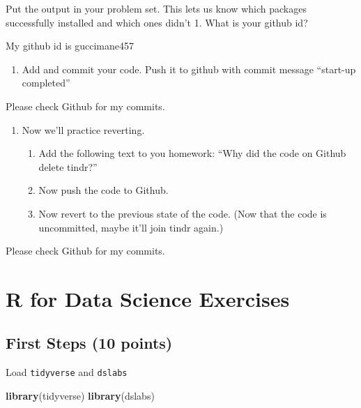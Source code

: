 \documentclass[
]{article}
\newenvironment{Shaded}{\begin{snugshade}}{\end{snugshade}}
\newcommand{\KeywordTok}[1]{\textcolor[rgb]{0.13,0.29,0.53}{\textbf{#1}}}
\newcommand{\NormalTok}[1]{#1}
\providecommand{\tightlist}{%
  \setlength{\itemsep}{0pt}\setlength{\parskip}{0pt}}
\begin{document}
Put the output in your problem set. This lets us know which packages
successfully installed and which ones didn't 1. What is your github id?

My github id is guccimane457

\begin{enumerate}
\def\labelenumi{\arabic{enumi}.}
\tightlist
\item
  Add and commit your code. Push it to github with commit message
  ``start-up completed''
\end{enumerate}

Please check Github for my commits.

\begin{enumerate}
\def\labelenumi{\arabic{enumi}.}
\tightlist
\item
  Now we'll practice reverting.

  \begin{enumerate}
  \def\labelenumii{\alph{enumii}.}
  \tightlist
  \item
    Add the following text to you homework: ``Why did the code on Github
    delete tindr?''
  \item
    Now push the code to Github.
  \item
    Now revert to the previous state of the code. (Now that the code is
    uncommitted, maybe it'll join tindr again.)
  \end{enumerate}
\end{enumerate}

Please check Github for my commits.

\hypertarget{r-for-data-science-exercises}{%
\section{R for Data Science
Exercises}\label{r-for-data-science-exercises}}

\hypertarget{first-steps-10-points}{%
\subsection{First Steps (10 points)}\label{first-steps-10-points}}

Load \texttt{tidyverse} and \texttt{dslabs}

\begin{Shaded}
\begin{Highlighting}[]
\KeywordTok{library}\NormalTok{(tidyverse)}
\KeywordTok{library}\NormalTok{(dslabs)}
\end{Highlighting}
\end{Shaded}
\end{document}
